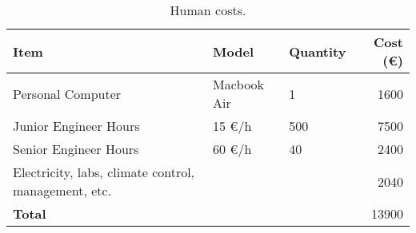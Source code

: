 \begin{table}[H]
    \begin{tabular}{ l l l r }
        \toprule
		\textbf{Item}  & \textbf{Model}                           & \textbf{Quantity} & \textbf{Cost (\euro)} \\
        \midrule
        Personal Computer & Macbook Air & 1 & 1600  \\
        Junior Engineer Hours & 15 \euro/h & 500 & 7500 \\
        Senior Engineer Hours & 60 \euro/h & 40 & 2400 \\
        Electricity, labs, climate control, management, etc. & & & 2040 \\
        \midrule
        \textbf{Total} & & & 13900 \\
        \bottomrule
    \end{tabular}
    \caption{Human costs.}\label{tab:human_costs}
\end{table}
